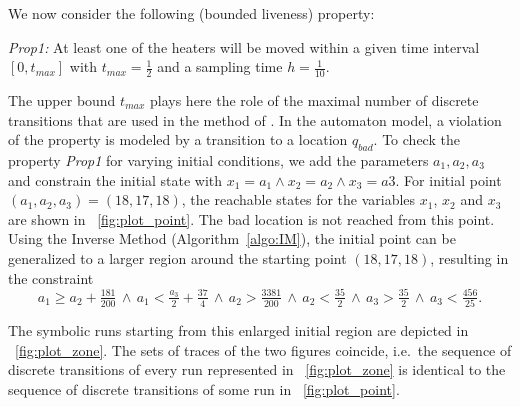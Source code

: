 \documentclass{llncs}
\begin{document}
\begin{example}
  We now consider the following (bounded liveness) property:
  \begin{description}
  \item{\textit{Prop1:}} At least one of the heaters will be moved within a
    given time interval $[0, t_{max}]$ with $t_{max} = \frac{1}{2}$
    and a sampling time $h=\frac{1}{10}$.
  \end{description}
  The upper bound $t_{max}$ plays here the role of the maximal number
  of discrete transitions that are used in the method of
  \cite{AKRS:2008}. In the automaton model, a violation of the
  property is modeled by a transition to a location $q_{bad}$. To
  check the property \textit{Prop1} for varying initial conditions, we add the
  parameters $a_1, a_2, a_3$ and constrain the initial state with
  $x_1=a_1 \wedge x_2=a_2 \wedge x_3=a3$.
For initial point $(a_1, a_2,
  a_3)=(18,17,18)$, the reachable states for the variables $x_1$,
  $x_2$ and $x_3$ are shown in \figurename~\ref{fig:plot_point}. The
  bad location is not reached from this point. Using the Inverse
  Method (Algorithm~\ref{algo:IM}), the initial point can be
  generalized to a larger region around the starting point $(18, 17,
  18)$, resulting in the constraint
  \begin{equation*}
    a_1 \geq a_2 + \tfrac{181}{200} \, \wedge \, a_1 < \tfrac{a_3}{2} + \tfrac{37}{4} \, \wedge \, a_2 > \tfrac{3381}{200} \, \wedge 
    \, a_2 < \tfrac{35}{2} \, \wedge \,  a_3 > \tfrac{35}{2} \, \wedge \, a_3 < \tfrac{456}{25}.
  \end{equation*}

  The symbolic runs starting from this enlarged initial region are
  depicted in \figurename~\ref{fig:plot_zone}.  The sets of traces of the
  two figures coincide, i.e.~the sequence of discrete transitions of
  every run represented in \figurename~\ref{fig:plot_zone} is identical
  to the sequence of discrete transitions of some run in
  \figurename~\ref{fig:plot_point}. 
\end{example}
\end{document}

